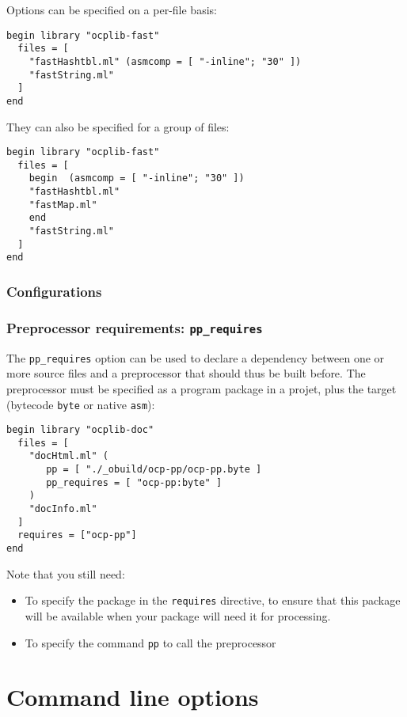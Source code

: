 Options can be specified on a per-file basis:

\begin{verbatim}
begin library "ocplib-fast"
  files = [
    "fastHashtbl.ml" (asmcomp = [ "-inline"; "30" ])
    "fastString.ml"
  ]
end
\end{verbatim}

They can also be specified for a group of files:

\begin{verbatim}
begin library "ocplib-fast"
  files = [
    begin  (asmcomp = [ "-inline"; "30" ])
    "fastHashtbl.ml"
    "fastMap.ml"
    end
    "fastString.ml"
  ]
end
\end{verbatim}


\subsubsection{Configurations}

\subsubsection{Preprocessor requirements: {\tt pp\_requires}}

The {\tt pp\_requires} option can be used to declare a dependency
between one or more source files and a preprocessor that should thus
be built before. The preprocessor must be specified as a program
package in a projet, plus the target (bytecode {\tt byte} or native
{\tt asm}):

\begin{verbatim}
begin library "ocplib-doc"
  files = [
    "docHtml.ml" (
       pp = [ "./_obuild/ocp-pp/ocp-pp.byte ]
       pp_requires = [ "ocp-pp:byte" ]
    )
    "docInfo.ml"
  ]
  requires = ["ocp-pp"]
end
\end{verbatim}

Note that you still need:
\begin{itemize}
\item To specify the package in the {\tt requires} directive, to ensure that
  this package will be available when your package will need it for processing.
\item To specify the command {\tt pp} to call the preprocessor
\end{itemize}

\section{Command line options}


